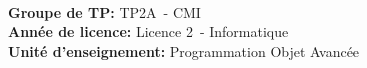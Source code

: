 \makeatletter %
\begin{titlepage} %
  \enlargethispage{3cm} %


  \begin{center}	
    \vspace*{7.5cm}
    \textsc{\@title} \\
    \vspace*{0,5cm} 
    \HRule%
    \vspace*{0,5cm}
    \large{\@author} \\ 
    \vspace*{0.6cm}
    \anneeUniversitaire\\
    \vspace*{1cm}
  \end{center}

  \vspace*{3cm}
  \noindent
  \large{\textbf{Groupe de TP:} TP2A~- CMI}\\
  \large{\textbf{Année de licence:} Licence 2~- Informatique}\\
  \large{\textbf{Unité d’enseignement:} Programmation Objet Avancée}\\
  \vspace*{0cm}

  

    
\end{titlepage}
\ClearShipoutPicture%
\newpage


